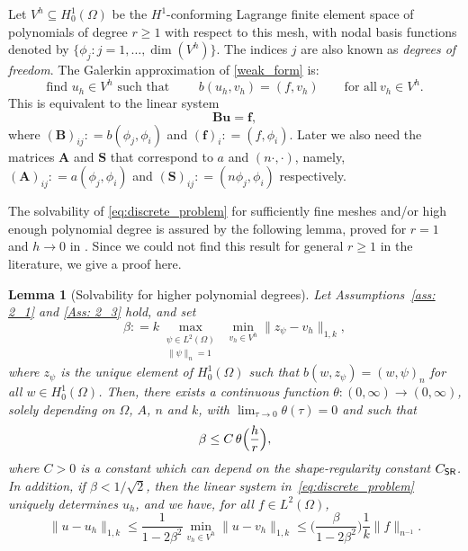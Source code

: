 \documentclass[numbers,webpdf,imaiai]{ima-authoring-template}%
\theoremstyle{thmstyletwo}%
\newtheorem{lemma}[theorem]{Lemma}
\numberwithin{equation}{section}
\newcommand{\shapereg}{C_{\textup{\textsf{SR}}}}
\newcommand{\assign}{\mathrel{\mathop:}=}
\numberwithin{equation}{section}
\begin{document}
{Let $V^h \subseteq H^1_0(\Omega)$ be the $H^1$-conforming Lagrange finite element space of polynomials of degree $r\ge 1$ 
with respect to this mesh, with nodal basis functions denoted by $\{\phi_j: j = 1, \ldots, \dim(V^h)\}$. 
The indices $j$ are also known as \textit{degrees of freedom}.  The Galerkin approximation of \eqref{weak_form} is:
\begin{equation}
\label{eq:discrete_problem}
	\text{find } u_h \in V^h \text{ such that }\qquad b(u_h,v_h) = (f,v_h) \qquad \text{for all} \ v_h \in V^h.
\end{equation}
This is equivalent to the linear system
\begin{equation}
\label{eq: 2_12}
	\mathbf{B}\mathbf{u} = \mathbf{f},
\end{equation}
where $(\mathbf{B})_{ij} \assign b(\phi_j, \phi_i)$ and $(\mathbf{f})_i \assign (f, \phi_i)$. 
Later we also need the matrices $\mathbf{A}$ and $\mathbf{S}$ that correspond to $a$ and $({n} \cdot,\cdot)$, 
namely, $(\mathbf{A})_{ij} \assign a(\phi_j, \phi_i)$ and $(\mathbf{S})_{ij} \assign ({n} \phi_j, \phi_i)$ respectively. 

The solvability of \eqref{eq:discrete_problem} for sufficiently fine meshes {and/or {high enough} polynomial degree} 
is assured by the following lemma, proved for $r=1$ {and $h \rightarrow 0$} in \cite[Theorem~2]{Schatz:1996:SNE}.
Since we could not find  this result for general  $r\ge 1$ in the literature, we give a proof here.

\begin{lemma}[Solvability for higher polynomial degrees]
\label{schatz_wang}
Let Assumptions~\ref{ass: 2_1} and \ref{Ass: 2_3} hold, and set
\begin{equation}
\label{eq:definition_gamma}
	\beta
	\assign
	k\max_{\substack{{\psi} \in L^2(\Omega) \\[0.2ex] {\|\psi\|_n = 1}}}\; \min_{v_h \in V^h} \|{z_\psi}-v_h\|_{1,k},
\end{equation}
where $z_\psi$ is the unique element of $H^1_0(\Omega)$ such that $b(w,{z_\psi}) = (w,\psi)_{{n}}$ for all $w \in H^1_0(\Omega)$. 
Then, there exists a continuous function $\theta: (0,\infty)\to(0,\infty)$, solely depending on $\Omega$, $A$, $n$ and $k$, 
with $\lim_{\tau \to 0} \theta(\tau) = 0$ and such that
\begin{equation}
\label{eq:estimate_gamma}
	\beta \le C \, \theta\Bigl(\frac{h}{r}\Bigr),
\end{equation}
where $C>0$ is a constant which can depend on the shape-regularity constant $\shapereg$.
In addition, if $\beta < 1/\sqrt{2}$, then the linear system in~\eqref{eq:discrete_problem} uniquely determines $u_h$, 
and we have, for all $f \in L^2(\Omega)$,
\begin{equation}
\label{eq:quasi_optimality}
	\|u-u_h\|_{1,k} \le \frac{1}{{1-2\beta^2}} \min_{v_h \in V^h} \|u-v_h\|_{1,k}
	\le \biggl(\frac{\beta}{{1-2\beta^2}}\biggr)\frac{1}{k} \|f\|_{{n^{-1}}}.
\end{equation}
\end{lemma}

}
\end{document}
